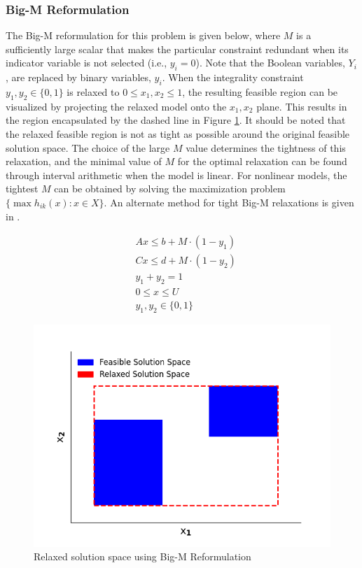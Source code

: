 \documentclass{juliacon}
\begin{document}
 \subsubsection{Big-M Reformulation}
 The Big-M reformulation for this problem is given below, where $M$ is a sufficiently large scalar that makes the particular constraint redundant when its indicator variable is not selected (i.e., $y_i = 0$). Note that the Boolean variables, $Y_i$, are replaced by binary variables, $y_i$. When the integrality constraint $y_1,y_2 \in \{0,1\}$ is relaxed to $0 \leq x_1, x_2 \leq 1$, the resulting feasible region can be visualized by projecting the relaxed model onto the $x_1, x_2$ plane. This results in the region encapsulated by the dashed line in Figure \ref{fig:bigm}. It should be noted that the relaxed feasible region is not as tight as possible around the original feasible solution space. The choice of the large $M$ value determines the tightness of this relaxation, and the minimal value of $M$ for the optimal relaxation can be found through interval arithmetic when the model is linear. For nonlinear models, the tightest $M$ can be obtained by solving the maximization problem $\{\max h_{ik}(x): x \in X\}$. An alternate method for tight Big-M relaxations is given in \cite{TRESPALACIOS201598}.
 
\begin{align*}
    & Ax \leq b + M \cdot (1 - y_1) \\
    & Cx \leq d + M \cdot (1 - y_2) \\
    & y_1 + y_2 = 1 \\
    & 0 \leq x \leq U \\
    & y_1, y_2 \in \{0,1\}
\end{align*}

\begin{figure}
    \centering
    \includegraphics[scale=0.5]{bigm.png}
    \caption{Relaxed solution space using Big-M Reformulation}
    \label{fig:bigm}
\end{figure}
\end{document}
